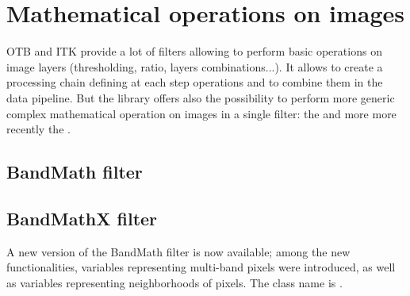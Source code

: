 





\section{Mathematical operations on images}
OTB and ITK provide a lot of filters allowing to perform basic operations on image layers (thresholding, ratio, layers combinations...).
It allows to create a processing chain defining at each step operations and to combine them in the data pipeline.
But the library offers also the possibility to perform more generic complex mathematical operation on images in a single filter: the
 and more more recently the .

\subsection{BandMath filter}
\label{sec:BandMathImageFilter}

\ifitkFullVersion

\fi

\subsection{BandMathX filter}
\label{sec:BandMathImageFilterX}
A new version of the BandMath filter is now available; among the new functionalities, variables representing multi-band pixels were introduced, as well as variables representing neighborhoods of pixels. The class name is .

